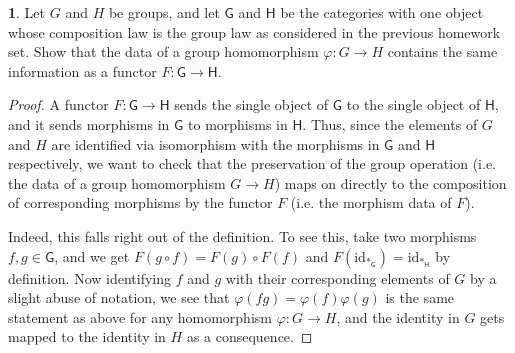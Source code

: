 \documentclass[12pt]{article}
\theoremstyle{definition}
\newtheorem{ex}{}
\begin{document}
\begin{ex}
	Let $G$ and $H$ be groups, and let $\mathsf{G}$ and $\mathsf{H}$ be the categories with one object whose composition law is the group law as considered in the previous homework set.
	Show that the data of a group homomorphism $\varphi : G \to H$ contains the same information as a functor $F: \mathsf{G} \to \mathsf{H}$.
\end{ex}
\begin{proof}
	A functor $F: \mathsf{G} \to \mathsf{H}$ sends the single object of $\mathsf{G}$ to the single object of $\mathsf{H}$, and it sends morphisms in $\mathsf{G}$ to morphisms in $\mathsf{H}$.
	Thus, since the elements of $G$ and $H$ are identified via isomorphism with the morphisms in $\mathsf{G}$ and $\mathsf{H}$ respectively, we want to check that the preservation of the group operation (i.e. the data of a group homomorphism $G \to H$) maps on directly to the composition of corresponding morphisms by the functor $F$ (i.e. the morphism data of $F$).

	Indeed, this falls right out of the definition.
	To see this, take two morphisms $f, g \in \mathsf{G}$, and we get $F(g \circ f) = F(g) \circ F(f)$ and $F(\mathrm{id}_{\ast_\mathsf{G}}) = \mathrm{id}_{\ast_\mathsf{H}}$ by definition.
	Now identifying $f$ and $g$ with their corresponding elements of $G$ by a slight abuse of notation, we see that $\varphi(fg) = \varphi(f)\varphi(g)$ is the same statement as above for any homomorphism $\varphi: G \to H$, and the identity in $G$ gets mapped to the identity in $H$ as a consequence.
\end{proof}
\end{document}
